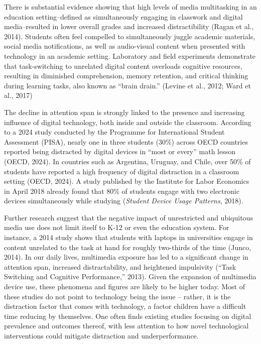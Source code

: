 \documentclass[
  titlepage]{article}
\begin{document}
There is substantial evidence showing that high levels of media
multitasking in an education setting--defined as simultaneously engaging
in classwork and digital media--resulted in lower overall grades and
increased distractibility (Ragan et al., 2014). Students often feel
compelled to simultaneously juggle academic materials, social media
notifications, as well as audio-visual content when presented with
technology in an academic setting. Laboratory and field experiments
demonstrate that task-switching to unrelated digital content overloads
cognitive resources, resulting in diminished comprehension, memory
retention, and critical thinking during learning tasks, also known as
``brain drain.'' (Levine et al., 2012; Ward et al., 2017)

The decline in attention span is strongly linked to the presence and
increasing influence of digital technology, both inside and outside the
classroom. According to a 2024 study conducted by the Programme for
International Student Assessment (PISA), nearly one in three students
(30\%) across OECD countries reported being distracted by digital
devices in ``most or every'' math lesson (OECD, 2024). In countries such
as Argentina, Uruguay, and Chile, over 50\% of students have reported a
high frequency of digital distraction in a classroom setting (OECD,
2024). A study published by the Institute for Labor Economics in April
2018 already found that 80\% of students engage with two electronic
devices simultaneously while studying (\emph{Student Device Usage
Patterns}, 2018).

Further research suggest that the negative impact of unrestricted and
ubiquitous media use does not limit itself to K-12 or even the education
system. For instance, a 2014 study shows that students with laptops in
universities engage in content unrelated to the task at hand for roughly
two-thirds of the time (Junco, 2014). In our daily lives, multimedia
exposure has led to a significant change in attention span, increased
distractability, and heightened impulsivity ({``Task Switching and
Cognitive Performance,''} 2013). Given the expansion of multimedia
device use, these phenomena and figures are likely to be higher today.
Most of these studies do not point to technology being the issue --
rather, it is the distraction factor that comes with technology, a
factor children have a difficult time reducing by themselves. One often
finds existing studies focusing on digital prevalence and outcomes
thereof, with less attention to how novel technological interventions
could mitigate distraction and underperformance.
\end{document}
